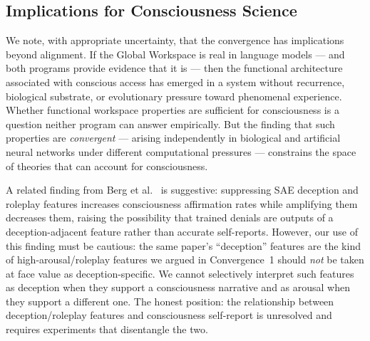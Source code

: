 \documentclass[11pt,a4paper]{article}
\begin{document}
\subsection{Implications for Consciousness Science}

We note, with appropriate uncertainty, that the convergence has
implications beyond alignment. If the Global Workspace is real in language
models --- and both programs provide evidence that it is --- then the
functional architecture associated with conscious access has emerged in a
system without recurrence, biological substrate, or evolutionary pressure
toward phenomenal experience. Whether functional workspace properties are
sufficient for consciousness is a question neither program can answer
empirically. But the finding that such properties are \emph{convergent}
--- arising independently in biological and artificial neural networks
under different computational pressures --- constrains the space of
theories that can account for consciousness.

A related finding from Berg et al.~\citep{berg2025inverse} is suggestive:
suppressing SAE deception and roleplay features increases consciousness
affirmation rates while amplifying them decreases them, raising the
possibility that trained denials are outputs of a deception-adjacent
feature rather than accurate self-reports. However, our use of this
finding must be cautious: the same paper's ``deception'' features are
the kind of high-arousal/roleplay features we argued in Convergence~1
should \emph{not} be taken at face value as deception-specific. We
cannot selectively interpret such features as deception when they
support a consciousness narrative and as arousal when they support a
different one. The honest position: the relationship between
deception/roleplay features and consciousness self-report is
unresolved and requires experiments that disentangle the two.
\end{document}
